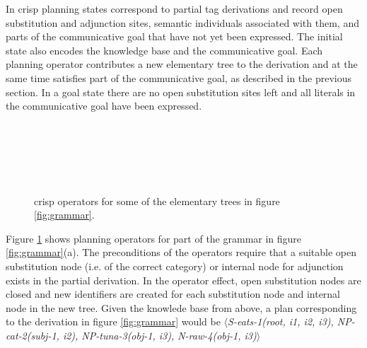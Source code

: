 In {\sc crisp} planning states correspond to partial {\sc tag} derivations and record open substitution and adjunction sites, semantic individuals associated with them, and parts of the communicative goal that have not yet been expressed.  The initial state also encodes the knowledge base and the communicative goal. Each planning operator contributes a new elementary tree to the derivation and at the same time satisfies part of the communicative goal, as described in the previous section. In a goal state there are no open substitution sites left and all literals in the communicative goal have been expressed. 
\begin{figure}[t]
\begin{center}
\\\smallskip

\\\smallskip

\\\smallskip
\end{center}
\caption{\label{fig:crisp-operators} {\sc crisp} operators for some of the elementary trees in figure \ref{fig:grammar}.}
\end{figure}


Figure \ref{fig:crisp-operators} shows planning operators for part of the grammar in figure \ref{fig:grammar}(a).
The preconditions of the operators require that a suitable open substitution node (i.e. of the correct category) or internal node for adjunction exists in the partial derivation. In the operator effect, open substitution nodes are closed and new identifiers are created for each substitution node and internal node in the new tree. Given the knowlede base from above, a plan corresponding to the derivation in figure \ref{fig:grammar} would be $\langle${\it S-eats-1(root, i1, i2, i3), NP-cat-2(subj-1, i2), NP-tuna-3(obj-1, i3), N-raw-4(obj-1, i3)}$\rangle$

